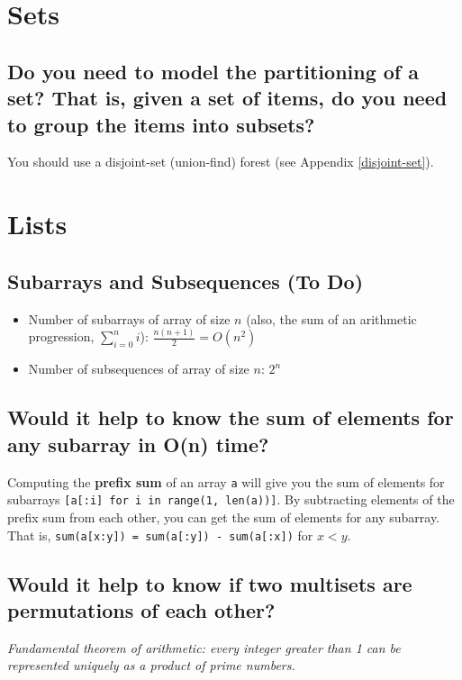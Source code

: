 \documentclass[12pt, titlepage]{article}
\begin{document}
\section{Sets}

\subsection{Do you need to model the partitioning of a set? That is, given a set of items, do you need to group the items into subsets?}

You should use a disjoint-set (union-find) forest (see Appendix \ref{disjoint-set}).

\section{Lists}

\subsection{Subarrays and Subsequences (To Do)}

\begin{itemize}
  \item Number of subarrays of array of size $n$ (also, the sum of an arithmetic progression, $\sum_{i=0}^{n}i$): $\frac{n(n+1)}{2} = O(n^2)$
  \item Number of subsequences of array of size $n$: $2^n$
\end{itemize}

\subsection{Would it help to know the sum of elements for any subarray in O(n) time?}

Computing the \textbf{prefix sum} of an array \texttt{a} will give you the sum of elements for subarrays \texttt{[a[:i] for i in range(1, len(a))]}. By subtracting elements of the prefix sum from each other, you can get the sum of elements for any subarray. That is, \texttt{sum(a[x:y]) = sum(a[:y]) - sum(a[:x])} for $x < y$. \\

\subsection{Would it help to know if two multisets are permutations of each other?}

\textit{Fundamental theorem of arithmetic: every integer greater than 1 can be represented uniquely as a product of prime numbers.} \medskip
\end{document}
